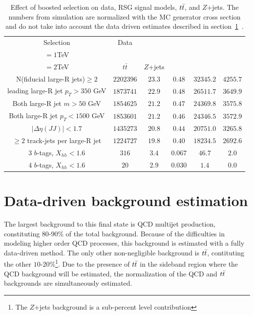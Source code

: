 \begin{table}[h!]
\centering
\captionsetup{justification=centering}

\hspace{-10pt}
\begin{tabular}{c|c|c|c|c|c}
Selection & Data & \specialcell{$m_{\Gkk}$ \\ $=1$TeV} & \specialcell{$m_{\Gkk}$\\ $=2$TeV} & $t\bar{t}$ & $Z$+jets \\
\hline
N(fiducial large-R jets)$\geq 2$ & $2202396$ & $23.3$ & $0.48$ & $32345.2$ & $4255.7$ \\
leading large-R jet $p_{T}>350$ GeV & $1873741$ & $22.9$ & $0.48$ & $26511.7$ & $3649.9$ \\
Both large-R jet $m>50$ GeV & $1854625$ & $21.2$ & $0.47$ & $24369.8$ & $3575.8$ \\
Both large-R jet $p_{T}<1500$ GeV & $1853601$ & $21.2$ & $0.46$ & $24346.5$ & $3572.9$ \\
$|\Delta\eta(JJ)|<1.7$ & $1435273$ & $20.8$ & $0.44$ & $20751.0$ & $3265.8$ \\
$\geq 2$ track-jets per large-R jet & $1224727$ & $19.8$ & $0.40$ & $18234.5$ & $2692.6$ \\
\hline
3 $b$-tags, $X_{hh}<1.6$ & $316$ & $3.4$ & $0.067$ & $46.7$ & $2.0$ \\
\hline
4 $b$-tags, $X_{hh}<1.6$ & $20$ & $2.9$ & $0.030$ & $1.4$ & $0.0$ \\
\hline
\end{tabular}

\caption{
Effect of boosted selection on data, RSG signal models, $t\bar{t}$, and $Z$+jets. The numbers from simulation are normalized with the MC generator cross section and do not take into account the data driven estimates described in section~\ref{sec:dd4b}~\cite{Qi}.
}
\label{tab:4bcutflow}
\end{table}

\section{Data-driven background estimation}
\label{sec:dd4b}

The largest background to this final state is QCD multijet production, constituting $80$-$90$\% of the total background. Because of the difficulties in modeling higher order QCD processes, this background is estimated with a fully data-driven method. The only other non-negligible background is $t\bar{t}$, contituting the other $10$-$20$\%\footnote{The $Z$+jets background is a sub-percent level contribution}.  Due to the presence of $t\bar{t}$ in the sideband region where the QCD background will be estimated, the normalization of the QCD and $t\bar{t}$ backgrounds are simultaneously estimated. 

